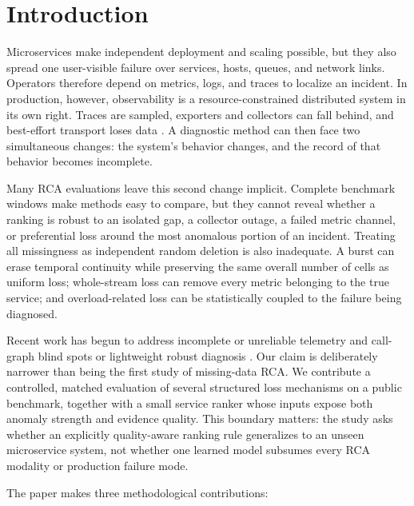 \documentclass[runningheads]{llncs}
\begin{document}
\section{Introduction}

Microservices make independent deployment and scaling possible, but they also
spread one user-visible failure over services, hosts, queues, and network
links. Operators therefore depend on metrics, logs, and traces to localize an
incident. In production, however, observability is a resource-constrained
distributed system in its own right. Traces are sampled, exporters and
collectors can fall behind, and best-effort transport loses data
\cite{observability2022,canopy2017,telemetryloss2018}. A diagnostic method can
then face two simultaneous changes: the system's behavior changes, and the
record of that behavior becomes incomplete.

Many RCA evaluations leave this second change implicit. Complete benchmark
windows make methods easy to compare, but they cannot reveal whether a ranking
is robust to an isolated gap, a collector outage, a failed metric channel, or
preferential loss around the most anomalous portion of an incident. Treating
all missingness as independent random deletion is also inadequate. A burst can
erase temporal continuity while preserving the same overall number of cells as
uniform loss; whole-stream loss can remove every metric belonging to the true
service; and overload-related loss can be statistically coupled to the failure
being diagnosed.

Recent work has begun to address incomplete or unreliable telemetry
\cite{reconrca2025,latentscope2024,mhprca2026} and call-graph blind spots or
lightweight robust diagnosis \cite{torai2026,fukuda2025robust}.
Our claim is deliberately narrower than being the first study of missing-data
RCA. We contribute a controlled, matched evaluation of several structured loss
mechanisms on a public benchmark, together with a small service ranker whose
inputs expose both anomaly strength and evidence quality. This boundary matters:
the study asks whether an explicitly quality-aware ranking rule generalizes to
an unseen microservice system, not whether one learned model subsumes every RCA
modality or production failure mode.

The paper makes three methodological contributions:
\end{document}
